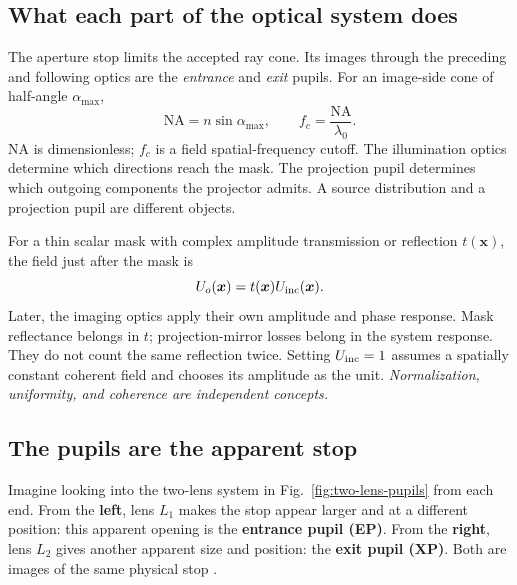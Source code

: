 \documentclass[11pt,a4paper]{article}
\numberwithin{equation}{section}
\newcommand{\vct}[1]{\bm{#1}}
\newcommand{\NA}{\mathrm{NA}}
\begin{document}
\subsection{What each part of the optical system does}
\begin{center}
\end{center}
The aperture stop limits the accepted ray cone. Its images through the
preceding and following optics are the \emph{entrance} and \emph{exit}
pupils.
For an image-side cone of half-angle $\alpha_{\max}$,
\begin{equation}
\NA=n\sin\alpha_{\max},\qquad
f_c=\frac{\NA}{\lambda_0}.
\label{eq:cutoff}
\end{equation}
NA is dimensionless; $f_c$ is a field spatial-frequency cutoff.
The illumination optics determine which directions reach the mask.
The projection pupil determines which outgoing components the projector
admits. A source distribution and a projection pupil are different objects.

For a thin scalar mask with complex amplitude transmission or reflection
$t(\vct x)$, the field just after the mask is
\begin{equation}
U_o(\vct x)=t(\vct x)U_{\rm inc}(\vct x).
\label{eq:mask}
\end{equation}
Later, the imaging optics apply their own amplitude and phase response.
Mask reflectance belongs in $t$; projection-mirror losses belong in the
system response. They do not count the same reflection twice.
Setting $U_{\rm inc}=1$ assumes a spatially constant coherent field and
chooses its amplitude as the unit. \emph{Normalization, uniformity, and
coherence are independent concepts.}

\subsection{The pupils are the apparent stop}
\label{sec:two-lens-pupils}
Imagine looking into the two-lens system in
Fig.~\ref{fig:two-lens-pupils} from each end.
From the \textbf{left}, lens $L_1$ makes the stop appear larger and at a
different position: this apparent opening is the \textbf{entrance pupil
(EP)}. From the \textbf{right}, lens $L_2$ gives another apparent size
and position: the \textbf{exit pupil (XP)}. Both are images of the same
physical stop \cite{bw,st}.
\end{document}
